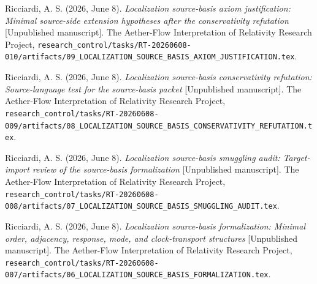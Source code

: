 \documentclass[11pt]{article}
\begin{document}
Ricciardi, A. S. (2026, June 8). \emph{Localization source-basis axiom
justification: Minimal source-side extension hypotheses after the
conservativity refutation} [Unpublished manuscript]. The Aether-Flow
Interpretation of Relativity Research Project,
\texttt{research\_control/tasks/RT-20260608-010/artifacts/09\_LOCALIZATION\_SOURCE\_BASIS\_AXIOM\_JUSTIFICATION.tex}.

Ricciardi, A. S. (2026, June 8). \emph{Localization source-basis
conservativity refutation: Source-language test for the source-basis packet}
[Unpublished manuscript]. The Aether-Flow Interpretation of Relativity
Research Project,
\texttt{research\_control/tasks/RT-20260608-009/artifacts/08\_LOCALIZATION\_SOURCE\_BASIS\_CONSERVATIVITY\_REFUTATION.tex}.

Ricciardi, A. S. (2026, June 8). \emph{Localization source-basis smuggling
audit: Target-import review of the source-basis formalization} [Unpublished
manuscript]. The Aether-Flow Interpretation of Relativity Research Project,
\texttt{research\_control/tasks/RT-20260608-008/artifacts/07\_LOCALIZATION\_SOURCE\_BASIS\_SMUGGLING\_AUDIT.tex}.

Ricciardi, A. S. (2026, June 8). \emph{Localization source-basis
formalization: Minimal order, adjacency, response, mode, and clock-transport
structures} [Unpublished manuscript]. The Aether-Flow Interpretation of
Relativity Research Project,
\texttt{research\_control/tasks/RT-20260608-007/artifacts/06\_LOCALIZATION\_SOURCE\_BASIS\_FORMALIZATION.tex}.
\end{document}

